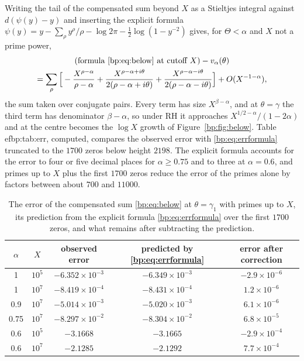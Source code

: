 Writing the tail of the compensated sum beyond $X$ as a Stieltjes integral against $d(\psi(y)-y)$ and inserting the explicit formula $\psi(y)=y-\sum_\rho y^\rho/\rho-\log2\pi-\frac12\log(1-y^{-2})$ \cite[Chapter~17]{Davenport} gives, for $\Theta<\alpha$ and $X$ not a prime power,
\begin{multline}\label{bp:eq:errformula}
\text{(formula \eqref{bp:eq:below} at cutoff }X)-v_\alpha(\theta)\\
=\sum_\rho\Big[-\frac{X^{\rho-\alpha}}{\rho-\alpha}+\frac{X^{\rho-\alpha+i\theta}}{2(\rho-\alpha+i\theta)}+\frac{X^{\rho-\alpha-i\theta}}{2(\rho-\alpha-i\theta)}\Big]+O(X^{-1-\alpha}),
\end{multline}
the sum taken over conjugate pairs. Every term has size $X^{\beta-\alpha}$, and at $\theta=\gamma$ the third term has denominator $\beta-\alpha$, so under RH it approaches $X^{1/2-\alpha}/(1-2\alpha)$ and at the centre becomes the $\log X$ growth of Figure~\ref{bp:fig:below}. Table~
ef{bp:tab:err}, computed, compares the observed error with \eqref{bp:eq:errformula} truncated to the $1700$ zeros below height $2198$. The explicit formula accounts for the error to four or five decimal places for $\alpha\ge0.75$ and to three at $\alpha=0.6$, and primes up to $X$ plus the first $1700$ zeros reduce the error of the primes alone by factors between about $700$ and $11000$.

\begin{table}[htbp]
\centering\small
\begin{tabular}{ccccc}
\toprule
$\alpha$ & $X$ & observed error & predicted by \eqref{bp:eq:errformula} & error after correction\\
\midrule
1 & $10^5$ & $-6.352\times10^{-3}$ & $-6.349\times10^{-3}$ & $-2.9\times10^{-6}$\\
1 & $10^7$ & $-8.419\times10^{-4}$ & $-8.431\times10^{-4}$ & $1.2\times10^{-6}$\\
0.9 & $10^7$ & $-5.014\times10^{-3}$ & $-5.020\times10^{-3}$ & $6.1\times10^{-6}$\\
0.75 & $10^7$ & $-8.297\times10^{-2}$ & $-8.304\times10^{-2}$ & $6.8\times10^{-5}$\\
0.6 & $10^5$ & $-3.1668$ & $-3.1665$ & $-2.9\times10^{-4}$\\
0.6 & $10^7$ & $-2.1285$ & $-2.1292$ & $7.7\times10^{-4}$\\
\bottomrule
\end{tabular}
\caption{The error of the compensated sum \eqref{bp:eq:below} at $\theta=\gamma_1$ with primes up to $X$, its prediction from the explicit formula \eqref{bp:eq:errformula} over the first $1700$ zeros, and what remains after subtracting the prediction.}
\label{bp:tab:err}
\end{table}


